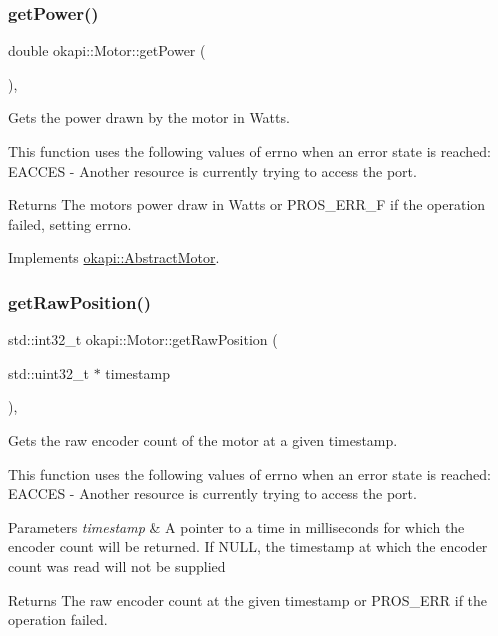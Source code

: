 \subsubsection{\texorpdfstring{getPower()}{getPower()}}
{\footnotesize\ttfamily double okapi\+::\+Motor\+::get\+Power (\begin{DoxyParamCaption}{ }\end{DoxyParamCaption})\hspace{0.3cm}{\ttfamily [override]}, {\ttfamily [virtual]}}

Gets the power drawn by the motor in Watts.

This function uses the following values of errno when an error state is reached\+: E\+A\+C\+C\+ES -\/ Another resource is currently trying to access the port.

\begin{DoxyReturn}{Returns}
The motor\textquotesingle{}s power draw in Watts or P\+R\+O\+S\+\_\+\+E\+R\+R\+\_\+F if the operation failed, setting errno. 
\end{DoxyReturn}


Implements \mbox{\hyperlink{classokapi_1_1AbstractMotor_aed423ac40cec85c5880f7954b6d810fe}{okapi\+::\+Abstract\+Motor}}.

\mbox{\label{classokapi_1_1Motor_a74c579c35863bc5180c9551fd5185d94}} 
\subsubsection{\texorpdfstring{getRawPosition()}{getRawPosition()}}
{\footnotesize\ttfamily std\+::int32\+\_\+t okapi\+::\+Motor\+::get\+Raw\+Position (\begin{DoxyParamCaption}\item[{std\+::uint32\+\_\+t $\ast$}]{timestamp }\end{DoxyParamCaption})\hspace{0.3cm}{\ttfamily [override]}, {\ttfamily [virtual]}}

Gets the raw encoder count of the motor at a given timestamp.

This function uses the following values of errno when an error state is reached\+: E\+A\+C\+C\+ES -\/ Another resource is currently trying to access the port.


\begin{DoxyParams}{Parameters}
{\em timestamp} & A pointer to a time in milliseconds for which the encoder count will be returned. If N\+U\+LL, the timestamp at which the encoder count was read will not be supplied\\
\hline
\end{DoxyParams}
\begin{DoxyReturn}{Returns}
The raw encoder count at the given timestamp or P\+R\+O\+S\+\_\+\+E\+RR if the operation failed. 
\end{DoxyReturn}


